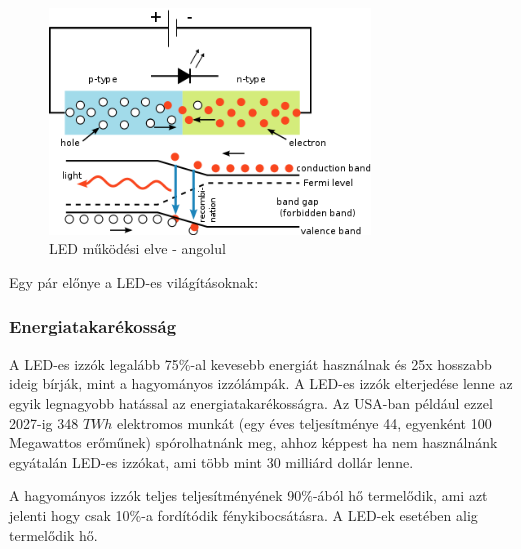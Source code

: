 \documentclass[../main.tex]{subfiles}
\begin{document}
    \begin{figure}[h!] %
        \centering
            \includegraphics[height=6cm]{irodalom_res/led_working_principle.png}
        \caption{LED működési elve - angolul} %
    \end{figure}
    Egy pár előnye a LED-es világításoknak:
        \subsubsection{Energiatakarékosság} %
            A LED-es izzók legalább 75\%-al kevesebb energiát használnak és 25x hosszabb ideig bírják, mint a hagyományos izzólámpák. A LED-es izzók elterjedése lenne az egyik legnagyobb hatással az energiatakarékosságra. Az USA-ban például ezzel 2027-ig 348 $TWh$ elektromos munkát (egy éves teljesítménye 44, egyenként 100 Megawattos erőműnek) spórolhatnánk meg, ahhoz képpest ha nem használnánk egyátalán LED-es izzókat, ami több mint 30 milliárd dollár lenne.
            
            A hagyományos izzók teljes teljesítményének 90\%-ából hő termelődik, ami azt jelenti hogy csak 10\%-a fordítódik fénykibocsátásra. A LED-ek esetében alig termelődik hő.
\end{document}
